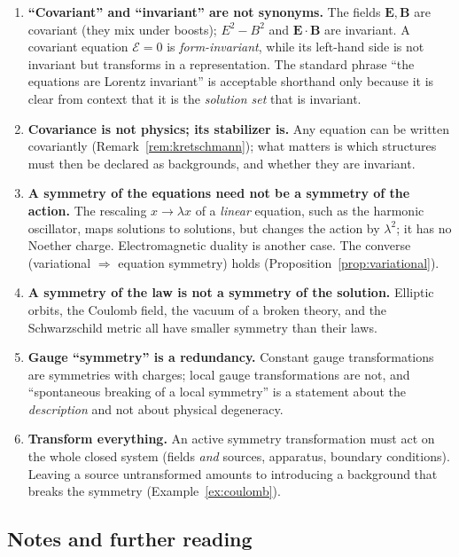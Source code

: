 \documentclass[11pt,a4paper,openany]{book}
\theoremstyle{definition}
\theoremstyle{plain}
\theoremstyle{remark}
\newcommand{\vE}{\bm{E}}
\newcommand{\vB}{\bm{B}}
\begin{document}
\begin{enumerate}[leftmargin=1.8em,itemsep=3pt,label=\textbf{\arabic*.}]
\item \textbf{``Covariant'' and ``invariant'' are not synonyms.} The fields
  $\vE,\vB$ are covariant (they mix under boosts); $E^2-B^2$ and
  $\vE\!\cdot\!\vB$ are invariant. A covariant equation $\mathcal E=0$ is
  \emph{form-invariant}, while its left-hand side is not invariant but
  transforms in a representation. The standard phrase ``the equations are
  Lorentz invariant'' is acceptable shorthand only because it is clear from
  context that it is the \emph{solution set} that is invariant.
\item \textbf{Covariance is not physics; its stabilizer is.} Any equation can
  be written covariantly (Remark~\ref{rem:kretschmann}); what matters is
  which structures must then be declared as backgrounds, and whether they are
  invariant.
\item \textbf{A symmetry of the equations need not be a symmetry of the action.}
  The rescaling $x\to\lambda x$ of a \emph{linear} equation, such as the
  harmonic oscillator, maps solutions to solutions, but changes the action by
  $\lambda^2$; it has no Noether charge. Electromagnetic duality is another case.
  The converse (variational $\Rightarrow$ equation symmetry) holds
  (Proposition~\ref{prop:variational}).
\item \textbf{A symmetry of the law is not a symmetry of the solution.}
  Elliptic orbits, the Coulomb field, the vacuum of a broken theory, and the
  Schwarzschild metric all have smaller symmetry than their laws.
\item \textbf{Gauge ``symmetry'' is a redundancy.} Constant gauge
  transformations are symmetries with charges; local gauge transformations are
  not, and ``spontaneous breaking of a local symmetry'' is a statement about
  the \emph{description} and not about physical degeneracy.
\item \textbf{Transform everything.} An active symmetry transformation must act on
  the whole closed system (fields \emph{and} sources, apparatus,
  boundary conditions). Leaving a source untransformed amounts to introducing a
  background that breaks the symmetry (Example~\ref{ex:coulomb}).
\end{enumerate}

\subsection{Notes and further reading}
\end{document}
